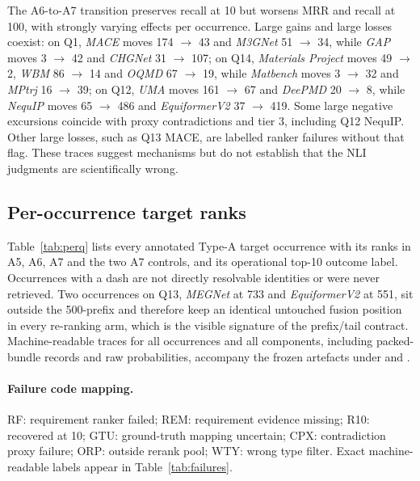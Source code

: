 \documentclass[11pt,a4paper]{article}
\begin{document}
The A6-to-A7 transition preserves recall at 10 but worsens MRR and recall at 100, with strongly varying effects per occurrence. Large gains and large losses coexist: on Q1, \emph{MACE} moves 174 $\to$ 43 and \emph{M3GNet} 51 $\to$ 34, while \emph{GAP} moves 3 $\to$ 42 and \emph{CHGNet} 31 $\to$ 107; on Q14, \emph{Materials Project} moves 49 $\to$ 2, \emph{WBM} 86 $\to$ 14 and \emph{OQMD} 67 $\to$ 19, while \emph{Matbench} moves 3 $\to$ 32 and \emph{MPtrj} 16 $\to$ 39; on Q12, \emph{UMA} moves 161 $\to$ 67 and \emph{DeePMD} 20 $\to$ 8, while \emph{NequIP} moves 65 $\to$ 486 and \emph{EquiformerV2} 37 $\to$ 419. Some large negative excursions coincide with proxy contradictions and tier 3, including Q12 NequIP. Other large losses, such as Q13 MACE, are labelled ranker failures without that flag. These traces suggest mechanisms but do not establish that the NLI judgments are scientifically wrong.

\subsection{Per-occurrence target ranks}

Table~\ref{tab:perq} lists every annotated Type-A target occurrence with its ranks in A5, A6, A7 and the two A7 controls, and its operational top-10 outcome label. Occurrences with a dash are not directly resolvable identities or were never retrieved. Two occurrences on Q13, \emph{MEGNet} at 733 and \emph{EquiformerV2} at 551, sit outside the 500-prefix and therefore keep an identical untouched fusion position in every re-ranking arm, which is the visible signature of the prefix/tail contract. Machine-readable traces for all occurrences and all components, including packed-bundle records and raw probabilities, accompany the frozen artefacts under  and .

\paragraph{Failure code mapping.} RF: requirement ranker failed; REM: requirement evidence missing; R10: recovered at 10; GTU: ground-truth mapping uncertain; CPX: contradiction proxy failure; ORP: outside rerank pool; WTY: wrong type filter. Exact machine-readable labels appear in Table~\ref{tab:failures}.
\end{document}
